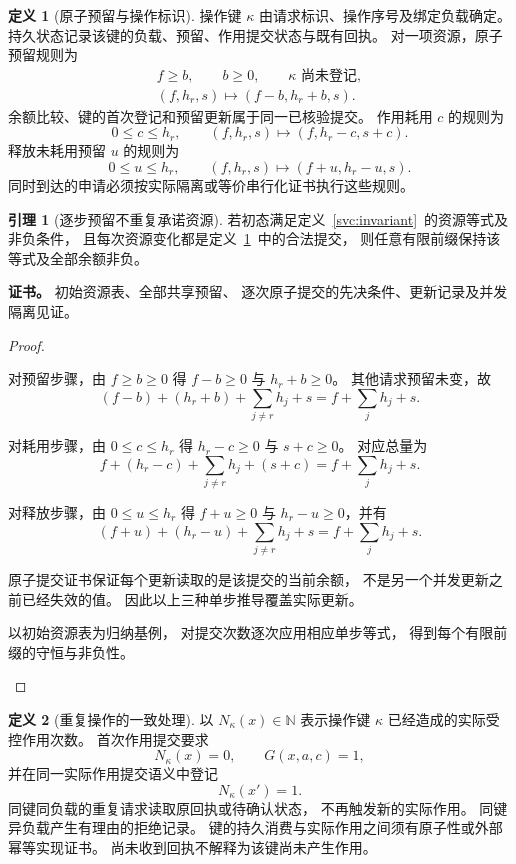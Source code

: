 \documentclass[UTF8,12pt,a4paper,openany,fontset=none,zihao=false]{ctexrep}
\theoremstyle{definition}
\newtheorem{definition}{定义}[chapter]
\newtheorem{lemma}{引理}[chapter]
\newenvironment{certificate}{\par\noindent\textbf{证书。}\ignorespaces}{\par}
\newcommand{\1}{\mathbf 1}
\begin{document}
\begin{definition}[原子预留与操作标识]
\label{svc:reservation}
操作键 \(\kappa\) 由请求标识、操作序号及绑定负载确定。
持久状态记录该键的负载、预留、作用提交状态与既有回执。
对一项资源，原子预留规则为
\[
\begin{gathered}
f\ge b,\qquad b\ge0,\qquad
\kappa\text{ 尚未登记},\\
(f,h_r,s)\longmapsto(f-b,h_r+b,s).
\end{gathered}
\]
余额比较、键的首次登记和预留更新属于同一已核验提交。
作用耗用 \(c\) 的规则为
\[
0\le c\le h_r,\qquad
(f,h_r,s)\longmapsto(f,h_r-c,s+c).
\]
释放未耗用预留 \(u\) 的规则为
\[
0\le u\le h_r,\qquad
(f,h_r,s)\longmapsto(f+u,h_r-u,s).
\]
同时到达的申请必须按实际隔离或等价串行化证书执行这些规则。
\end{definition}

\begin{lemma}[逐步预留不重复承诺资源]
\label{svc:resource-invariant}
若初态满足定义~\ref{svc:invariant}~的资源等式及非负条件，
且每次资源变化都是定义~\ref{svc:reservation}~中的合法提交，
则任意有限前缀保持该等式及全部余额非负。
\end{lemma}
\begin{certificate}
初始资源表、全部共享预留、
逐次原子提交的先决条件、更新记录及并发隔离见证。
\end{certificate}
\begin{proof}
\begin{semanticsteps}
\item 对预留步骤，由 \(f\ge b\ge0\) 得
\(f-b\ge0\) 与 \(h_r+b\ge0\)。
其他请求预留未变，故
\[
(f-b)+(h_r+b)+
\sum_{j\ne r}h_j+s
=f+\sum_j h_j+s.
\]
\item 对耗用步骤，由 \(0\le c\le h_r\) 得
\(h_r-c\ge0\) 与 \(s+c\ge0\)。
对应总量为
\[
f+(h_r-c)+
\sum_{j\ne r}h_j+(s+c)
=f+\sum_j h_j+s.
\]
\item 对释放步骤，由 \(0\le u\le h_r\) 得
\(f+u\ge0\) 与 \(h_r-u\ge0\)，并有
\[
(f+u)+(h_r-u)+
\sum_{j\ne r}h_j+s
=f+\sum_j h_j+s.
\]
\item 原子提交证书保证每个更新读取的是该提交的当前余额，
不是另一个并发更新之前已经失效的值。
因此以上三种单步推导覆盖实际更新。
\item 以初始资源表为归纳基例，
对提交次数逐次应用相应单步等式，
得到每个有限前缀的守恒与非负性。
\end{semanticsteps}
\end{proof}

\begin{definition}[重复操作的一致处理]
\label{svc:idempotency}
以 \(N_\kappa(x)\in\mathbb N\) 表示操作键 \(\kappa\)
已经造成的实际受控作用次数。
首次作用提交要求
\[
N_\kappa(x)=0,\qquad G(x,a,c)=1,
\]
并在同一实际作用提交语义中登记
\[
N_\kappa(x')=1.
\]
同键同负载的重复请求读取原回执或待确认状态，
不再触发新的实际作用。
同键异负载产生有理由的拒绝记录。
键的持久消费与实际作用之间须有原子性或外部幂等实现证书。
尚未收到回执不解释为该键尚未产生作用。
\end{definition}
\end{document}
